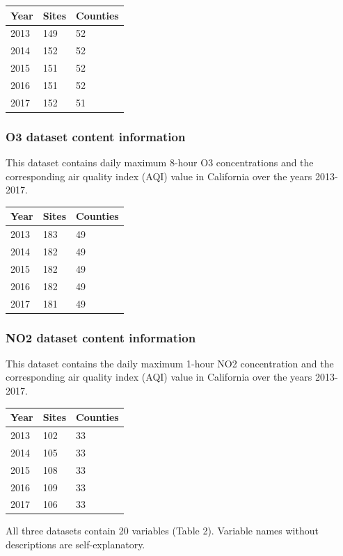 \documentclass[12pt,]{article}
\begin{document}
\begin{longtable}[]{@{}lll@{}}
\toprule
Year & Sites & Counties\tabularnewline
\midrule
\endhead
2013 & 149 & 52\tabularnewline
2014 & 152 & 52\tabularnewline
2015 & 151 & 52\tabularnewline
2016 & 151 & 52\tabularnewline
2017 & 152 & 51\tabularnewline
\bottomrule
\end{longtable}

\hypertarget{o3-dataset-content-information}{%
\subsubsection{O3 dataset content
information}\label{o3-dataset-content-information}}

This dataset contains daily maximum 8-hour O3 concentrations and the
corresponding air quality index (AQI) value in California over the years
2013-2017.

\begin{longtable}[]{@{}lll@{}}
\toprule
Year & Sites & Counties\tabularnewline
\midrule
\endhead
2013 & 183 & 49\tabularnewline
2014 & 182 & 49\tabularnewline
2015 & 182 & 49\tabularnewline
2016 & 182 & 49\tabularnewline
2017 & 181 & 49\tabularnewline
\bottomrule
\end{longtable}

\hypertarget{no2-dataset-content-information}{%
\subsubsection{NO2 dataset content
information}\label{no2-dataset-content-information}}

This dataset contains the daily maximum 1-hour NO2 concentration and the
corresponding air quality index (AQI) value in California over the years
2013-2017.

\begin{longtable}[]{@{}lll@{}}
\toprule
Year & Sites & Counties\tabularnewline
\midrule
\endhead
2013 & 102 & 33\tabularnewline
2014 & 105 & 33\tabularnewline
2015 & 108 & 33\tabularnewline
2016 & 109 & 33\tabularnewline
2017 & 106 & 33\tabularnewline
\bottomrule
\end{longtable}

All three datasets contain 20 variables (Table 2). Variable names
without descriptions are self-explanatory.
\end{document}
